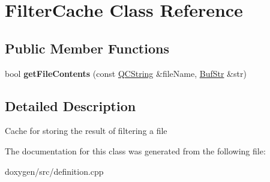 \hypertarget{class_filter_cache}{}\section{Filter\+Cache Class Reference}
\label{class_filter_cache}
\subsection*{Public Member Functions}
\begin{DoxyCompactItemize}
\item 
\mbox{\label{class_filter_cache_a47fdf15e198bf751e5cce596e8abcbdf}} 
bool {\bfseries get\+File\+Contents} (const \mbox{\hyperlink{class_q_c_string}{Q\+C\+String}} \&file\+Name, \mbox{\hyperlink{class_buf_str}{Buf\+Str}} \&str)
\end{DoxyCompactItemize}


\subsection{Detailed Description}
Cache for storing the result of filtering a file 

The documentation for this class was generated from the following file\+:\begin{DoxyCompactItemize}
\item 
doxygen/src/definition.\+cpp\end{DoxyCompactItemize}
